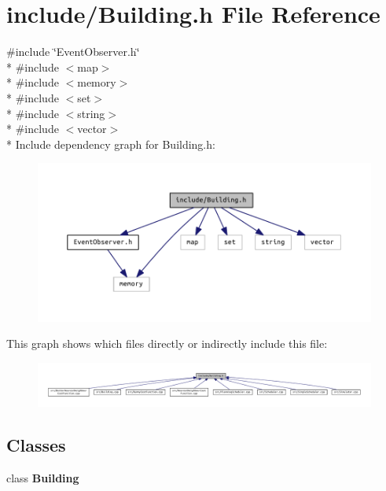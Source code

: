 \section{include/\+Building.h File Reference}
\label{_building_8h}
{\ttfamily \#include \char`\"{}Event\+Observer.\+h\char`\"{}}\\*
{\ttfamily \#include $<$map$>$}\\*
{\ttfamily \#include $<$memory$>$}\\*
{\ttfamily \#include $<$set$>$}\\*
{\ttfamily \#include $<$string$>$}\\*
{\ttfamily \#include $<$vector$>$}\\*
Include dependency graph for Building.\+h\+:\nopagebreak
\begin{figure}[H]
\begin{center}
\leavevmode
\includegraphics[width=350pt]{_building_8h__incl}
\end{center}
\end{figure}
This graph shows which files directly or indirectly include this file\+:\nopagebreak
\begin{figure}[H]
\begin{center}
\leavevmode
\includegraphics[width=350pt]{_building_8h__dep__incl}
\end{center}
\end{figure}
\subsection*{Classes}
\begin{DoxyCompactItemize}
\item 
class {\bf Building}
\end{DoxyCompactItemize}
